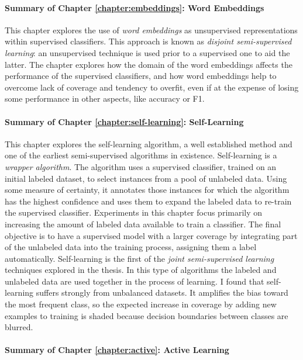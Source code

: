 \paragraph{Summary of Chapter \ref{chapter:embeddings}: Word Embeddings}

This chapter explores the use of {\em word embeddings} as unsupervised
representations within supervised classifiers. This approach is known as {\em
disjoint semi-supervised learning}: an unsupervised technique is used prior to
a supervised one to aid the latter. The chapter explores how the domain of the
word embeddings affects the performance of the supervised classifiers, and how
word embeddings help to overcome lack of coverage and tendency to overfit,
even if at the expense of losing some performance in other aspects, like 
accuracy or F1.

\paragraph{Summary of Chapter \ref{chapter:self-learning}: Self-Learning}

This chapter explores the self-learning algorithm, a well established method
and one of the earliest semi-supervised algorithms in existence.  Self-learning
is a {\em wrapper algorithm}. The algorithm uses a supervised classifier,
trained on an initial labeled dataset, to select instances from a pool of
unlabeled data. Using some measure of certainty, it annotates those instances
for which the algorithm has the highest confidence and uses them to expand the
labeled data to re-train the supervised classifier. Experiments in this chapter
focus primarily on increasing the amount of labeled data available to train a
classifier. The final objective is to have a supervised model with a larger
coverage by integrating part of the unlabeled data into the training process,
assigning them a label automatically. Self-learning is the first of the {\em
joint semi-supervised learning} techniques explored in the thesis.  In this
type of algorithms the labeled and unlabeled data are used together in the
process of learning. I found that self-learning suffers strongly from
unbalanced datasets. It amplifies the bias toward the most frequent class, so
the expected increase in coverage by adding new examples to training is shaded
because decision boundaries between classes are blurred.

\paragraph{Summary of Chapter \ref{chapter:active}: Active Learning}

